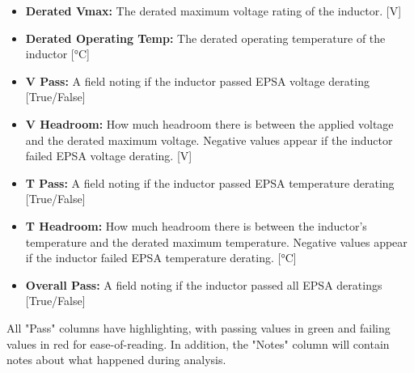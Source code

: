 \documentclass[12pt]{article}
\begin{document}
\begin{itemize}
    \item \textbf{Derated Vmax:} The derated maximum voltage rating of the inductor. [V]
    \item \textbf{Derated Operating Temp:} The derated operating temperature of the inductor [°C]
    \item \textbf{V Pass:} A field noting if the inductor passed EPSA voltage derating [True/False]
    \item \textbf{V Headroom:} How much headroom there is between the applied voltage and the derated maximum voltage. Negative values appear if the inductor failed EPSA voltage derating. [V]
    \item \textbf{T Pass:} A field noting if the inductor passed EPSA temperature derating [True/False]
    \item \textbf{T Headroom:} How much headroom there is between the inductor's temperature and the derated maximum temperature. Negative values appear if the inductor failed EPSA temperature derating. [°C]
    \item \textbf{Overall Pass:} A field noting if the inductor passed all EPSA deratings [True/False]
\end{itemize}

All "Pass" columns have highlighting, with passing values in green and failing values in red for ease-of-reading. In addition, the "Notes" column will contain notes about what happened during analysis.
\end{document}
